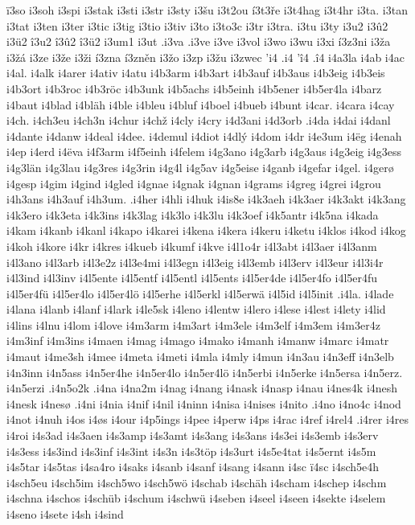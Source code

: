 {{ï3so
i3soh
i3spi
i3stak
i3sti
i3str
i3sty
i3šu
i3t2ou
í3t3ře
i3t4hag
i3t4hr
i3ta.
i3tan
i3tat
i3ten
i3ter
i3tic
i3tig
i3tio
i3tiv
i3to
i3to3c
i3tr
i3tra.
i3tu
i3ty
i3u2
i3û2
i3ü2
î3u2
î3û2
î3ü2
i3um1
i3ut
.i3va
.i3ve
i3ve
i3vol
i3wo
i3wu
i3xi
í3z3ni
i3ža
i3žá
i3ze
i3že
i3ži
í3zna
í3zněn
i3žo
i3zp
i3žu
i3zwec
'i4
.i4
'î4
.î4
i4a3la
i4ab
i4ac
i4al.
i4alk
i4arer
i4ativ
i4atu
i4b3arm
i4b3art
i4b3auf
i4b3aus
i4b3eig
i4b3eis
i4b3ort
i4b3roc
i4b3röc
i4b3unk
i4b5achs
i4b5einh
i4b5ener
i4b5er4la
i4barz
i4baut
i4blad
i4bläh
i4ble
i4bleu
i4bluf
i4boel
i4bueb
i4bunt
i4car.
i4cara
i4cay
i4ch.
i4ch3eu
i4ch3n
i4chur
i4chž
i4cly
i4cry
i4d3ani
i4d3orb
.i4da
i4dai
i4danl
i4dante
i4danw
i4deal
i4dee.
i4demul
i4diot
i4dlý
i4dom
i4dr
i4e3um
i4ëg
i4enah
i4ep
i4erd
i4ëva
i4f3arm
i4f5einh
i4felem
i4g3ano
i4g3arb
i4g3aus
i4g3eig
i4g3ess
i4g3län
i4g3lau
i4g3res
i4g3rin
i4g4l
i4g5av
i4g5eise
i4ganb
i4gefar
i4gel.
i4gerø
i4gesp
i4gim
i4gind
i4gled
i4gnae
i4gnak
i4gnan
i4grams
i4greg
i4grei
i4grou
i4h3ans
i4h3auf
i4h3um.
.i4her
i4hli
i4huk
i4is8e
i4k3aeh
i4k3aer
i4k3akt
i4k3ang
i4k3ero
i4k3eta
i4k3ins
i4k3lag
i4k3lo
i4k3lu
i4k3oef
i4k5antr
i4k5na
i4kada
i4kam
i4kanb
i4kanl
i4kapo
i4karei
i4kena
i4kera
i4keru
i4ketu
i4klos
i4kod
i4kog
i4koh
i4kore
i4kr
i4kres
i4kueb
i4kumf
i4kve
i4l1o4r
i4l3abt
i4l3aer
i4l3anm
i4l3ano
i4l3arb
i4l3e2z
i4l3e4mi
i4l3egn
i4l3eig
i4l3emb
i4l3erv
i4l3eur
i4l3i4r
i4l3ind
i4l3inv
i4l5ente
i4l5entf
i4l5entl
i4l5ents
i4l5er4de
i4l5er4fo
i4l5er4fu
i4l5er4fü
i4l5er4lo
i4l5er4lö
i4l5erhe
i4l5erkl
i4l5erwä
i4l5id
i4l5init
.i4la.
i4lade
i4lana
i4lanb
i4lanf
i4lark
i4le5sk
i4leno
i4lentw
i4lero
i4lese
i4lest
i4lety
i4lid
i4lins
i4lnu
i4lom
i4love
i4m3arm
i4m3art
i4m3ele
i4m3elf
i4m3em
i4m3er4z
i4m3inf
i4m3ins
i4maen
i4mag
i4mago
i4mako
i4manh
i4manw
i4marc
i4matr
i4maut
i4me3sh
i4mee
i4meta
i4meti
i4mla
i4mly
i4mun
i4n3au
i4n3eff
i4n3elb
i4n3inn
i4n5ass
i4n5er4he
i4n5er4lo
i4n5er4lö
i4n5erbi
i4n5erke
i4n5ersa
i4n5erz.
i4n5erzi
.i4n5o2k
.i4na
i4na2m
i4nag
i4nang
i4nask
i4nasp
i4nau
i4nes4k
i4nesh
i4nesk
i4nesø
.i4ni
i4nia
i4nif
i4nil
i4ninn
i4nisa
i4nises
i4nito
.i4no
i4no4c
i4nod
i4not
i4nuh
i4os
i4øs
i4our
i4p5ings
i4pee
i4perw
i4ps
i4rac
i4ref
i4rel4
.i4rer
i4res
i4roi
i4s3ad
i4s3aen
i4s3amp
i4s3amt
i4s3ang
i4s3ans
i4s3ei
i4s3emb
i4s3erv
i4s3ess
i4s3ind
i4s3inf
i4s3int
i4s3n
i4s3töp
i4s3urt
i4s5e4tat
i4s5ernt
i4s5m
i4s5tar
i4s5tas
i4sa4ro
i4saks
i4sanb
i4sanf
i4sang
i4sann
i4sc
ï4sc
i4sch5e4h
i4sch5eu
i4sch5im
i4sch5wo
i4sch5wö
i4schab
i4schäh
i4scham
i4schep
i4schm
i4schna
i4schos
i4schüb
i4schum
i4schwü
i4seben
i4seel
i4seen
i4sekte
i4selem
i4seno
i4sete
i4sh
i4sind
}}
